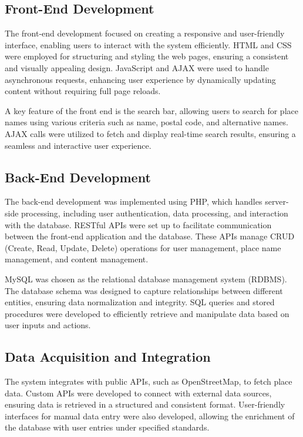 \subsection{Front-End Development}
The front-end development focused on creating a responsive and user-friendly interface, enabling users to interact with the system efficiently. HTML and CSS were employed for structuring and styling the web pages, ensuring a consistent and visually appealing design. JavaScript and AJAX were used to handle asynchronous requests, enhancing user experience by dynamically updating content without requiring full page reloads.

A key feature of the front end is the search bar, allowing users to search for place names using various criteria such as name, postal code, and alternative names. AJAX calls were utilized to fetch and display real-time search results, ensuring a seamless and interactive user experience.

\subsection{Back-End Development}
The back-end development was implemented using PHP, which handles server-side processing, including user authentication, data processing, and interaction with the database. RESTful APIs were set up to facilitate communication between the front-end application and the database. These APIs manage CRUD (Create, Read, Update, Delete) operations for user management, place name management, and content management.

MySQL was chosen as the relational database management system (RDBMS). The database schema was designed to capture relationships between different entities, ensuring data normalization and integrity. SQL queries and stored procedures were developed to efficiently retrieve and manipulate data based on user inputs and actions.

\subsection{Data Acquisition and Integration}
The system integrates with public APIs, such as OpenStreetMap, to fetch place data. Custom APIs were developed to connect with external data sources, ensuring data is retrieved in a structured and consistent format. User-friendly interfaces for manual data entry were also developed, allowing the enrichment of the database with user entries under specified standards.

